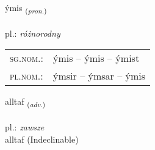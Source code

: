 \documentclass[frontgrid, backgrid]{flacards}\usepackage[]{graphicx}\usepackage[]{xcolor}
\begin{document}
\renewcommand{\blhead}{\vskip5pt {\small\bfseries\footnotesize Fornafn | Pronoun }}
\renewcommand{\bcfoot}{\vskip5pt \hspace{2pt}{\small\bfseries\footnotesize 1K}}


{ýmis \small{\textsubscript{(\textit{pron.})}} \\[1ex] %
\textphonetic{[iːmɪs]} \\
pl.: \emph{różnorodny} \\  [2ex]
\renewcommand*{\arraystretch}{0.8}
\begin{tabular}{ll}
\textsc{sg.nom.}: & ýmis  --  ýmis -- ýmist \\ 
\textsc{pl.nom.}: & ýmsir -- ýmsar -- ýmis
\end{tabular}
}


\renewcommand{\flhead}{\vskip5pt \fboxsep=0pt {\small\bfseries\footnotesize Atviksorð | Adverb}}
\renewcommand{\fcfoot}{\vskip5pt \fboxsep=0pt \hspace{2pt}{\small\bfseries\footnotesize 1K}}

\renewcommand{\blhead}{\vskip5pt {\small\bfseries\footnotesize Atviksorð | Adverb }}
\renewcommand{\bcfoot}{\vskip5pt \hspace{2pt}{\small\bfseries\footnotesize 1K}}


{alltaf \small{\textsubscript{(\textit{adv.})}} \\[1ex]
\textphonetic{[al̥taf]} \\
pl.: \emph{zawsze} \\  [2ex]
alltaf (Indeclinable)}


\renewcommand{\flhead}{\vskip5pt \fboxsep=0pt {\small\bfseries\footnotesize Atviksorð | Adverb}}
\renewcommand{\fcfoot}{\vskip5pt \fboxsep=0pt \hspace{2pt}{\small\bfseries\footnotesize 1K}}

\renewcommand{\blhead}{\vskip5pt {\small\bfseries\footnotesize Atviksorð | Adverb }}
\renewcommand{\bcfoot}{\vskip5pt \hspace{2pt}{\small\bfseries\footnotesize 1K}}
\end{document}
